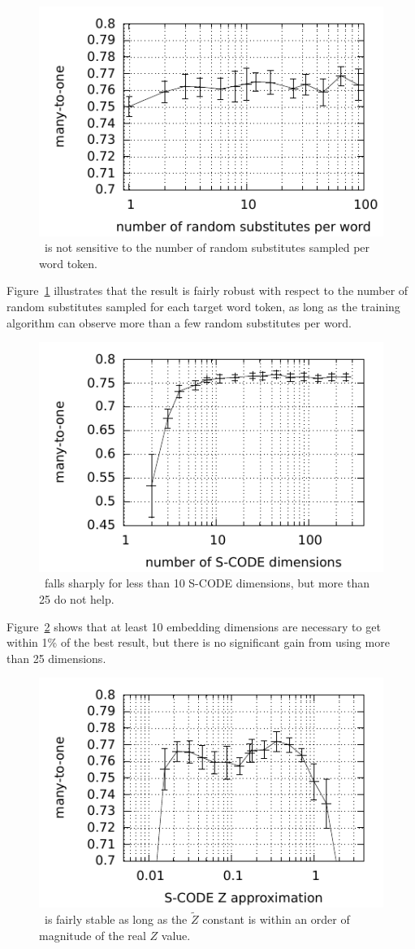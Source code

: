 \begin{figure}[ht] \centering
\includegraphics[width=0.65\linewidth]{plot-s-cl.pdf}
\caption{\mto\ is not sensitive to the number of random substitutes
  sampled per word token.}
\label{plot-s}
\end{figure}

Figure~\ref{plot-s} illustrates that the result is fairly robust with
respect to the number of random substitutes sampled for each target
word token, as long as the training algorithm can observe more than a
few random substitutes per word.

\begin{figure}[ht] \centering
\includegraphics[width=0.65\linewidth]{plot-d-cl.pdf}
\caption{\mto\ falls sharply for less than 10 S-CODE dimensions, but
  more than 25 do not help.}
\label{plot-d}
\end{figure}

Figure~\ref{plot-d} shows that at least 10 embedding dimensions are
necessary to get within 1\% of the best result, but there is no
significant gain from using more than 25 dimensions.

\begin{figure}[ht] \centering
\includegraphics[width=0.65\linewidth]{plot-z-cl.pdf}
\caption{\mto\ is fairly stable as long as the $\tilde{Z}$ constant is
  within an order of magnitude of the real $Z$ value.}
\label{plot-z}
\end{figure}

